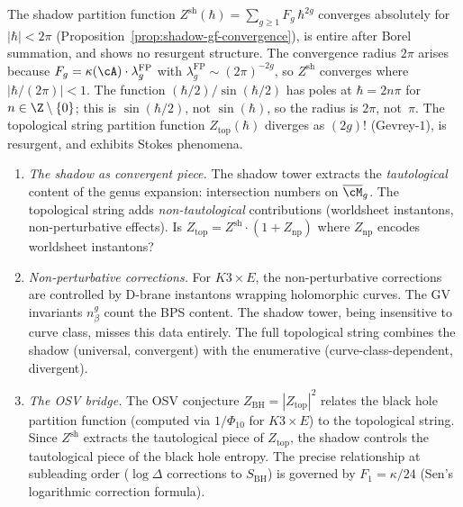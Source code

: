 
\begin{openproblem}
\label{op:programme-j-convergence}
The shadow partition function $Z^{\mathrm{sh}}(\hbar) =
\sum_{g \geq 1} F_g\,\hbar^{2g}$ converges absolutely for
$|\hbar| < 2\pi$ (Proposition~\ref{prop:shadow-gf-convergence}),
is entire after Borel summation, and shows no resurgent
structure. The convergence radius $2\pi$ arises because
$F_g = \kappa(\cA) \cdot \lambda_g^{\mathrm{FP}}$ with
$\lambda_g^{\mathrm{FP}} \sim (2\pi)^{-2g}$, so
$Z^{\mathrm{sh}}$ converges where $|\hbar/(2\pi)| < 1$.
The function $(\hbar/2)/\sin(\hbar/2)$ has poles at
$\hbar = 2n\pi$ for $n \in \Z \setminus \{0\}$; this is
$\sin(\hbar/2)$, not $\sin(\hbar)$, so the radius is
$2\pi$, not~$\pi$.
The topological string partition function
$Z_{\mathrm{top}}(\hbar)$ diverges as $(2g)!$ (Gevrey-$1$),
is resurgent, and exhibits Stokes phenomena.
\begin{enumerate}[label=\textup{(J\arabic*)}]
\item \emph{The shadow as convergent piece.}
 The shadow tower extracts the \emph{tautological}
 content of the genus expansion: intersection numbers on
 $\overline{\cM}_g$. The topological string adds
 \emph{non-tautological} contributions (worldsheet
 instantons, non-perturbative effects). Is
 $Z_{\mathrm{top}} = Z^{\mathrm{sh}} \cdot (1 +
 Z_{\mathrm{np}})$ where $Z_{\mathrm{np}}$ encodes
 worldsheet instantons?
\item \emph{Non-perturbative corrections.} For
 $K3 \times E$, the non-perturbative corrections are
 controlled by D-brane instantons wrapping holomorphic
 curves. The GV invariants $n^g_\beta$ count the
 BPS content. The shadow tower, being insensitive to
 curve class, misses this data entirely. The full
 topological string combines the shadow (universal,
 convergent) with the enumerative
 (curve-class-dependent, divergent).
\item \emph{The OSV bridge.}
 The OSV conjecture $Z_{\mathrm{BH}} = |Z_{\mathrm{top}}|^2$
 relates the black hole partition function (computed via
 $1/\Phi_{10}$ for $K3 \times E$) to the topological
 string. Since $Z^{\mathrm{sh}}$ extracts the
 tautological piece of $Z_{\mathrm{top}}$, the shadow
 controls the tautological piece of the black hole entropy.
 The precise relationship at subleading order ($\log\Delta$
 corrections to $S_{\mathrm{BH}}$) is governed by
 $F_1 = \kappa/24$ (Sen's logarithmic correction
 formula).
\end{enumerate}
\end{openproblem}


